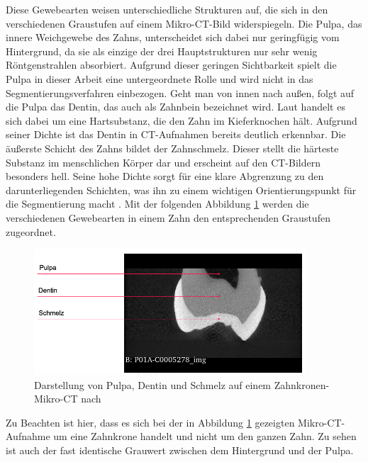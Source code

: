 Diese Gewebearten weisen unterschiedliche Strukturen auf, die sich in den
verschiedenen Graustufen auf einem Mikro-\ac{CT}-Bild widerspiegeln. Die Pulpa, das
innere Weichgewebe des Zahns, unterscheidet sich dabei nur geringfügig vom
Hintergrund, da sie als einzige der drei Hauptstrukturen nur sehr wenig Röntgenstrahlen
absorbiert. Aufgrund dieser geringen Sichtbarkeit spielt die Pulpa in dieser
Arbeit eine untergeordnete Rolle und wird nicht in das Segmentierungsverfahren
einbezogen. Geht man von innen nach außen, folgt auf die Pulpa das Dentin, das auch
als Zahnbein bezeichnet wird. Laut \citet[S.~41]{lehmann2012Zahnheilkunde} handelt
es sich dabei um eine Hartsubstanz, die den Zahn im Kieferknochen hält. Aufgrund
seiner Dichte ist das Dentin in \ac{CT}-Aufnahmen bereits deutlich erkennbar. Die
äußerste Schicht des Zahns bildet der Zahnschmelz. Dieser stellt die härteste
Substanz im menschlichen Körper dar und erscheint auf den \ac{CT}-Bildern besonders
hell. Seine hohe Dichte sorgt für eine klare Abgrenzung zu den darunterliegenden
Schichten, was ihn zu einem wichtigen Orientierungspunkt für die Segmentierung macht
\citep[vgl.][S.~41]{lehmann2012Zahnheilkunde}. Mit der folgenden Abbildung \ref{fig:pulpa_dentin_schmelz}
werden die verschiedenen Gewebearten in einem Zahn den entsprechenden Graustufen
zugeordnet.

\begin{figure}[h]
	\centering
	\includegraphics[width=0.9\textwidth]{img/dentin_schmelz_pulpa.png}
	\caption{Darstellung von Pulpa, Dentin und Schmelz auf einem Zahnkronen-Mikro-CT
	nach \citet{heck2024}}
	\label{fig:pulpa_dentin_schmelz}
\end{figure}

Zu Beachten ist hier, dass es sich bei der in Abbildung \ref{fig:pulpa_dentin_schmelz}
gezeigten Mikro-\ac{CT}-Aufnahme um eine Zahnkrone handelt und nicht um den
ganzen Zahn. Zu sehen ist auch der fast identische Grauwert zwischen dem Hintergrund
und der Pulpa.


